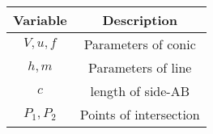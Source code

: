 \begin{tabular}[12pt]{ |c| c|}
    \hline
    \textbf{Variable} & \textbf{Description}\\ 
    \hline
    $V,u,f$ & Parameters of conic \\
    \hline 
    $h,m$ & Parameters of line \\
    \hline
     $c$ & length of side-AB \\
     \hline
     $P_1,P_2$ & Points of intersection \\
    \hline
\end{tabular}

